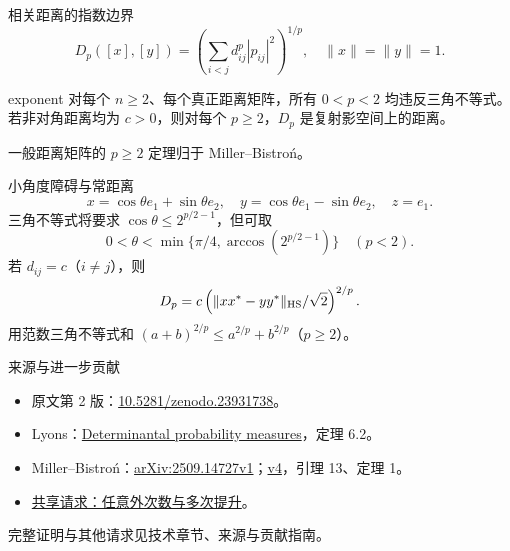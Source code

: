 \documentclass{beamer}
\begin{document}
\begin{frame}{相关距离的指数边界}
\small
\[
D_p([x],[y])=\left(\sum_{i<j}d_{ij}^p|p_{ij}|^2\right)^{1/p},\quad\|x\|=\|y\|=1.
\]
\begin{bookresult}{exponent}
对每个 $n\ge2$、每个真正距离矩阵，所有 $0<p<2$ 均违反三角不等式。若非对角距离均为 $c>0$，则对每个 $p\ge2$，$D_p$ 是复射影空间上的距离。
\end{bookresult}
\small 一般距离矩阵的 $p\ge2$ 定理归于 Miller--Bistroń。
\end{frame}
\begin{frame}{小角度障碍与常距离}
\small
\[
x=\cos\theta e_1+\sin\theta e_2,\quad y=\cos\theta e_1-\sin\theta e_2,
\quad z=e_1.
\]
三角不等式将要求 $\cos\theta\le2^{p/2-1}$，但可取
\[
0<\theta\mathrel{<}\min\{\pi/4,\arccos(2^{p/2-1})\}\quad(p<2).
\]
若 $d_{ij}=c$（$i\ne j$），则
\[
D_p=c\left(\|xx^*-yy^*\|_{\rm HS}/\sqrt2\right)^{2/p}.
\]
用范数三角不等式和 $(a+b)^{2/p}\le a^{2/p}+b^{2/p}$（$p\ge2$）。
\end{frame}
\begin{frame}{来源与进一步贡献}
\footnotesize
\begin{itemize}
\item 原文第 2 版：\href{https://doi.org/10.5281/zenodo.23931738}{10.5281/zenodo.23931738}。
\item Lyons：\href{https://doi.org/10.1007/s10240-003-0016-0}{Determinantal probability measures}，定理 6.2。
\item Miller--Bistroń：\href{https://arxiv.org/abs/2509.14727v1}{arXiv:2509.14727v1}；\href{https://arxiv.org/abs/2509.14727v4}{v4}，引理 13、定理 1。
\item \href{https://github.com/the-omega-institute/trureturing-requests/issues/121}{共享请求：任意外次数与多次提升}。
\end{itemize}
\normalsize 完整证明与其他请求见技术章节、来源与贡献指南。
\end{frame}
\FormalVerification
\end{document}
